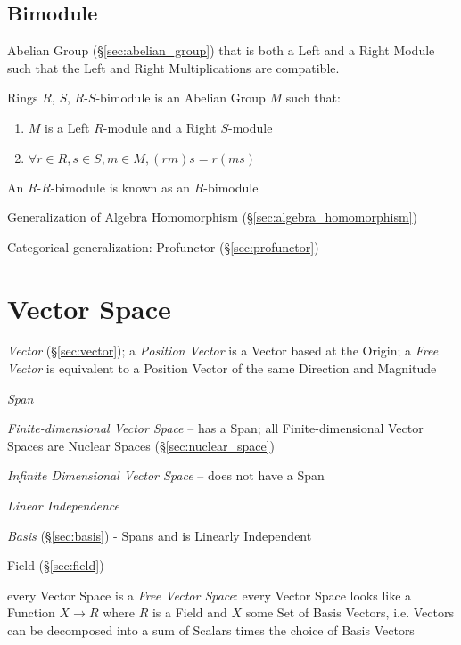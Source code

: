 \subsection{Bimodule}\label{sec:bimodule}

Abelian Group (\S\ref{sec:abelian_group}) that is both a Left and a
Right Module such that the Left and Right Multiplications are
compatible.

Rings $R$, $S$, $R$-$S$-bimodule is an Abelian Group $M$ such that:

\begin{enumerate}
\item $M$ is a Left $R$-module and a Right $S$-module
\item $\forall r \in R, s \in S, m \in M, (rm)s = r(ms)$
\end{enumerate}

An $R$-$R$-bimodule is known as an $R$-bimodule

Generalization of Algebra Homomorphism
(\S\ref{sec:algebra_homomorphism})

Categorical generalization: Profunctor (\S\ref{sec:profunctor})



\section{Vector Space}\label{sec:vector_space}

\emph{Vector} (\S\ref{sec:vector}); a \emph{Position Vector} is a Vector based
at the Origin; a \emph{Free Vector} is equivalent to a Position Vector of the
same Direction and Magnitude

\emph{Span}

\emph{Finite-dimensional Vector Space} -- has a Span; all
Finite-dimensional Vector Spaces are Nuclear Spaces
(\S\ref{sec:nuclear_space})

\emph{Infinite Dimensional Vector Space} -- does not have a Span

\emph{Linear Independence}

\emph{Basis} (\S\ref{sec:basis}) - Spans and is Linearly Independent

Field (\S\ref{sec:field})

every Vector Space is a \emph{Free Vector Space}: every Vector Space
looks like a Function $X \rightarrow R$ where $R$ is a Field and $X$
some Set of Basis Vectors, i.e. Vectors can be decomposed into a sum
of Scalars times the choice of Basis Vectors %

